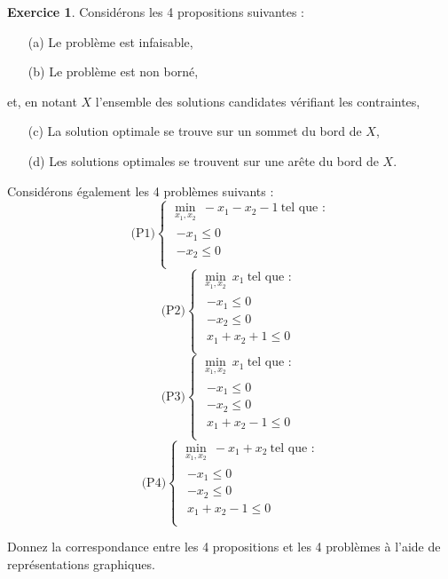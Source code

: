 \documentclass[a4paper,francais]{article}
\theoremstyle{definition}
\newtheorem{exercice}{Exercice}[section]
\begin{document}
\begin{exercice}
  \label{ex:ex}
  Considérons les 4 propositions suivantes :
  \begin{itemize}
  \item[(a)] Le problème est infaisable,
  \item[(b)] Le problème est non borné,
  \end{itemize}
  et, en notant $X$ l'ensemble des
  solutions candidates vérifiant les contraintes,
  \begin{itemize}
  \item[(c)] La solution optimale se trouve sur un sommet du bord de $X$,
  \item[(d)] Les solutions optimales se trouvent sur une arête du bord de $X$.
  \end{itemize}
  
  Considérons également les 4 problèmes suivants :
  \[
  \text{(P1)}
  \left\{
  \begin{array}{c}
    \min_{x_1,x_2} \ -x_1 - x_2 - 1 \ \text{tel que :} \\
    \begin{array}{ll}
      -x_1 \leq 0 \\
      -x_2 \leq 0 \\
    \end{array} 
  \end{array}
  \right.
  \]
  \[
  \text{(P2)}
  \left\{
  \begin{array}{c}
    \min_{x_1,x_2} \ x_1 \ \text{tel que :} \\
    \begin{array}{ll}
      -x_1 \leq 0 \\
      -x_2 \leq 0 \\
      x_1 + x_2 + 1 \leq 0 \\
    \end{array} 
  \end{array}
  \right.
  \]
  \[
  \text{(P3)}
  \left\{
  \begin{array}{c}
    \min_{x_1,x_2} \ x_1 \ \text{tel que :} \\
    \begin{array}{ll}
      -x_1 \leq 0 \\
      -x_2 \leq 0 \\
      x_1 + x_2 - 1 \leq 0 \\
    \end{array} 
  \end{array}
  \right.
  \]
  \[
  \text{(P4)}
  \left\{
  \begin{array}{c}
    \min_{x_1,x_2} \ -x_1+x_2 \ \text{tel que :} \\
    \begin{array}{ll}
      -x_1 \leq 0 \\
      -x_2 \leq 0 \\
      x_1 + x_2 - 1 \leq 0 \\
    \end{array} 
  \end{array}
  \right.
  \]

  Donnez la correspondance entre les 4 propositions et les 4 problèmes
  à l'aide de représentations graphiques.
\end{exercice}
\end{document}
